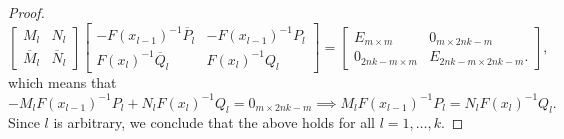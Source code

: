 \documentclass[11pt,reqno,oneside,a4paper]{article}
\theoremstyle{plain} %
\theoremstyle{definition}
\theoremstyle{remark}
\begin{document}
\begin{proof}
\[ 
\begin{bmatrix}
M_l & N_l \\
\overline{M}_l & \overline{N}_l
\end{bmatrix} 
\begin{bmatrix}
- F(x_{l-1})^{-1} \overline{P}_l & - F(x_{l-1})^{-1} P_l \\
F(x_l)^{-1}\overline{Q}_l & F(x_l)^{-1}Q_l
\end{bmatrix}
= 
\begin{bmatrix}
E_{m\times m} & 0_{m\times 2nk-m} \\
0_{2nk-m\times m} & E_{2nk-m\times 2nk-m} .
\end{bmatrix},
\] 
which means that 
\[ 
-  M_l  F(x_{l-1})^{-1} P_l + N_l F(x_l)^{-1}Q_l   =  0_{m\times 2nk-m} \implies M_l  F(x_{l-1})^{-1} P_l = N_l F(x_l)^{-1}Q_l.
\]
Since $l$ is arbitrary, we conclude that the above holds for all $l = 1, \ldots, k.$


\end{proof}
\end{document}
